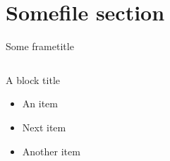 \section{Somefile section}

\begin{frame}{Some frametitle}
  \begin{columns}[c]
  \begin{block}{A block title}
    \begin{itemize}
      \item An item 
      \item Next item 
      \item Another item
    \end{itemize}
  \end{block} 
  \begin{center}
    
  \end{center}
  \end{columns}
\end{frame}
